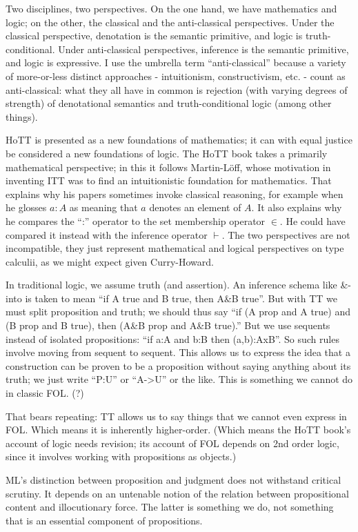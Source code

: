 \documentclass{article}
\begin{document}
Two disciplines, two perspectives.  On the one hand, we have
mathematics and logic; on the other, the classical and the
anti-classical perspectives.  Under the classical perspective,
denotation is the semantic primitive, and logic is truth-conditional.
Under anti-classical perspectives, inference is the semantic
primitive, and logic is expressive.  I use the umbrella term
``anti-classical'' because a variety of more-or-less distinct
approaches - intuitionism, constructivism, etc. - count as
anti-classical: what they all have in common is rejection (with
varying degrees of strength) of denotational semantics and
truth-conditional logic (among other things).

HoTT is presented as a new foundations of mathematics; it can with
equal justice be considered a new foundations of logic.  The HoTT book
takes a primarily mathematical perspective; in this it follows
Martin-Löff, whose motivation in inventing ITT was to find an
intuitionistic foundation for mathematics.  That explains why his
papers sometimes invoke classical reasoning, for example when he
glosses \(a:A\) as meaning that \(a\) denotes an element of \(A\).  It
also explains why he compares the ``:'' operator to the set membership
operator \(\in\).  He could have compared it instead with the
inference operator \(\vdash\).  The two perspectives are not
incompatible, they just represent mathematical and logical
perspectives on type calculii, as we might expect given Curry-Howard.

In traditional logic, we assume truth (and assertion).  An inference
schema like \&-into is taken to mean ``if A true and B true, then A\&B
true''.  But with TT we must split proposition and truth; we should
thus say ``if (A prop and A true) and (B prop and B true), then (A\&B
prop and A\&B true).''  But we use sequents instead of isolated
propositions: ``if a:A and b:B then (a,b):AxB''.  So such rules
involve moving from sequent to sequent.  This allows us to express the
idea that a construction can be proven to be a proposition without
saying anything about its truth; we just write ``P:U'' or ``A->U'' or
the like.  This is something we cannot do in classic FOL. (?)

That bears repeating: TT allows us to say things that we cannot even
express in FOL.  Which means it is inherently higher-order.  (Which
means the HoTT book's account of logic needs revision; its account of
FOL depends on 2nd order logic, since it involves working with
propositions as objects.)

ML's distinction  between proposition and judgment  does not withstand
critical scrutiny.  It depends on  an untenable notion of the relation
between propositional content and  illocutionary force.  The latter is
something  we do,  not something  that  is an  essential component  of
propositions.
\end{document}
